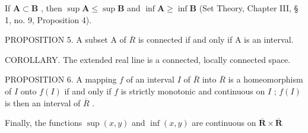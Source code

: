 If \(\mathbf{A} \subset \mathbf{B}\) , then \(\sup \mathbf{A} \leqslant \sup \mathbf{B}\) and \(\inf \mathbf{A} \geqslant \inf \mathbf{B}\) (Set Theory, Chapter III, § 1, no. 9, Proposition 4).

PROPOSITION 5. A subset A of \(\overline{R}\) is connected if and only if A is an interval.

COROLLARY. The extended real line is a connected, locally connected space.

PROPOSITION 6. A mapping \(f\) of an interval \(I\) of \(\overline{R}\) into \(\overline{R}\) is a homeomorphism of \(I\) onto \(f(I)\) if and only if \(f\) is strictly monotonic and continuous on \(I\) ; \(f(I)\) is then an interval of \(\overline{R}\) .

Finally, the functions \(\sup (x,y)\) and \(\inf (x,y)\) are continuous on \(\overline{\mathbf{R}}\times \overline{\mathbf{R}}\)

